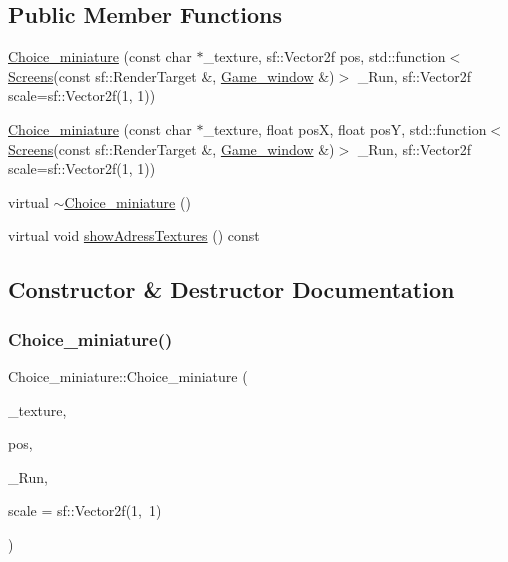 \subsection*{Public Member Functions}
\begin{DoxyCompactItemize}
\item 
\hyperlink{class_choice__miniature_a9466ce86f30c59539f7fc0ef3acc23a7}{Choice\+\_\+miniature} (const char $\ast$\+\_\+texture, sf\+::\+Vector2f pos, std\+::function$<$ \hyperlink{_globals_8h_a3d5776bab98402b03be09156bacf4f68}{Screens}(const sf\+::\+Render\+Target \&, \hyperlink{class_game__window}{Game\+\_\+window} \&)$>$ \+\_\+\+Run, sf\+::\+Vector2f scale=sf\+::\+Vector2f(1, 1))
\item 
\hyperlink{class_choice__miniature_ab84a88a43356f11596390de6700f7d38}{Choice\+\_\+miniature} (const char $\ast$\+\_\+texture, float posX, float posY, std\+::function$<$ \hyperlink{_globals_8h_a3d5776bab98402b03be09156bacf4f68}{Screens}(const sf\+::\+Render\+Target \&, \hyperlink{class_game__window}{Game\+\_\+window} \&)$>$ \+\_\+\+Run, sf\+::\+Vector2f scale=sf\+::\+Vector2f(1, 1))
\item 
virtual \hyperlink{class_choice__miniature_aa04b8d4c3ad3e99efad7ffe433d96fbe}{$\sim$\+Choice\+\_\+miniature} ()
\item 
virtual void \hyperlink{class_choice__miniature_a6f413024d98b0c334c5a3e6ec87eba9b}{show\+Adress\+Textures} () const
\end{DoxyCompactItemize}


\subsection{Constructor \& Destructor Documentation}
\mbox{\label{class_choice__miniature_a9466ce86f30c59539f7fc0ef3acc23a7}} 
\subsubsection{\texorpdfstring{Choice\+\_\+miniature()}{Choice\_miniature()}\hspace{0.1cm}{\footnotesize\ttfamily [1/2]}}
{\footnotesize\ttfamily Choice\+\_\+miniature\+::\+Choice\+\_\+miniature (\begin{DoxyParamCaption}\item[{const char $\ast$}]{\+\_\+texture,  }\item[{sf\+::\+Vector2f}]{pos,  }\item[{std\+::function$<$ \hyperlink{_globals_8h_a3d5776bab98402b03be09156bacf4f68}{Screens}(const sf\+::\+Render\+Target \&, \hyperlink{class_game__window}{Game\+\_\+window} \&)$>$}]{\+\_\+\+Run,  }\item[{sf\+::\+Vector2f}]{scale = {\ttfamily sf\+:\+:Vector2f(1,~1)} }\end{DoxyParamCaption})}

